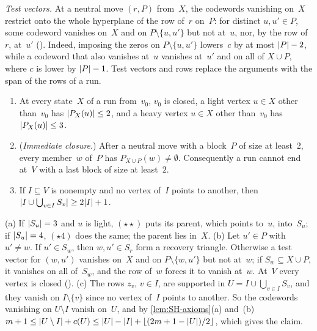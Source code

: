 \emph{Test vectors.} At a neutral move $(r,P)$ from~$X$, the codewords vanishing on~$X$ restrict onto the whole hyperplane of
the row of~$r$ on~$P$: for distinct $u,u'\in P$, some codeword vanishes on~$X$ and on $P\setminus\{u,u'\}$ but not at~$u$, nor,
by the row of~$r$, at~$u'$ (). Indeed, imposing the zeros on $P\setminus\{u,u'\}$ lowers~$c$ by at most
$\lvert P \rvert-2$, while a codeword that also vanishes at~$u$ vanishes at~$u'$ and on all of $X\cup P$, where $c$ is lower by
$\lvert P \rvert-1$. Test vectors and rows replace the arguments with the span of the rows of a run.

\begin{lemma}\label{lem:SH-tools}
\begin{enumerate}[label=(\alph*)]
\item At every state~$X$ of a run from~$v_0$, $v_0$ is closed, a light vertex $u\in X$ other than~$v_0$ has
$\lvert P_X(u) \rvert\le2$, and a heavy vertex $u\in X$ other than~$v_0$ has $\lvert P_X(u) \rvert\le3$.
\item (\emph{Immediate closure}.) After a neutral move with a block~$P$ of size at least~$2$, every member~$w$ of~$P$ has
$P_{X\cup P}(w)\ne\emptyset$. Consequently a run cannot end at~$V$ with a last block of size at least~$2$.
\item If $I\subseteq V$ is nonempty and no vertex of~$I$ points to another, then $\lvert I\cup\bigcup_{v\in I}S_v \rvert\ge2\lvert I \rvert+1$.
\end{enumerate}
\end{lemma}

\begin{outline}
(a) If $\lvert S_u \rvert=3$ and $u$ is light, $(\star\star)$ puts its parent, which points to~$u$, into~$S_u$; if $\lvert S_u \rvert=4$,
$(\star4)$ does the same; the parent lies in~$X$. (b) Let $u'\in P$ with $u'\ne w$. If $u'\in S_w$, then $w,u'\in S_r$ form a
recovery triangle. Otherwise a test vector for $(w,u')$ vanishes on~$X$ and on $P\setminus\{w,u'\}$ but not at~$w$; if
$S_w\subseteq X\cup P$, it vanishes on all of~$S_w$, and the row of~$w$ forces it to vanish at~$w$. At~$V$ every vertex is
closed (). (c) The rows $z_v$, $v\in I$, are supported in $U=I\cup\bigcup_{v\in I}S_v$, and they vanish on $I\setminus\{v\}$ since no
vertex of~$I$ points to another. So the codewords vanishing on $U\setminus I$ vanish on~$U$, and by \cref{lem:SH-axioms}(a) and~(b)
$m+1\le\lvert U\setminus I \rvert+c(U)\le\lvert U \rvert-\lvert I \rvert+\lfloor(2m+1-\lvert U \rvert)/2\rfloor$, which gives the claim.
\end{outline}

